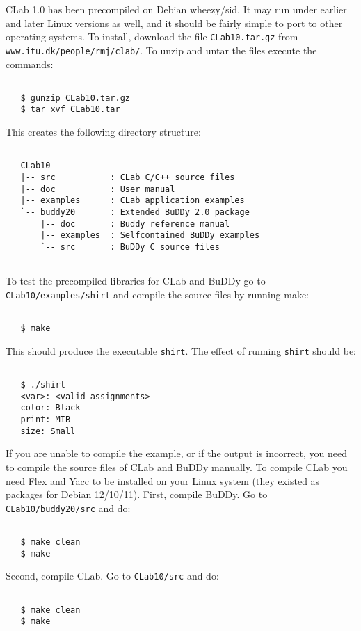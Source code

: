 \documentclass{article}
\begin{document}
CLab 1.0 has been precompiled on Debian wheezy/sid. It may run under
earlier and later Linux versions as well, and it should be fairly simple to 
port to other operating systems. To install, download the file
\texttt{CLab10.tar.gz} from \texttt{www.itu.dk/people/rmj/clab/}. To unzip and
untar the files execute the commands:
\begin{verbatim}

   $ gunzip CLab10.tar.gz
   $ tar xvf CLab10.tar

\end{verbatim}
This creates the following directory structure:
\begin{verbatim}
   
   CLab10
   |-- src           : CLab C/C++ source files
   |-- doc           : User manual
   |-- examples      : CLab application examples
   `-- buddy20       : Extended BuDDy 2.0 package 
       |-- doc       : Buddy reference manual
       |-- examples  : Selfcontained BuDDy examples
       `-- src       : BuDDy C source files
 
\end{verbatim}
To test the precompiled libraries for CLab and BuDDy go to
\texttt{CLab10/examples/shirt} and compile the source files by running
make:
\begin{verbatim}

   $ make

\end{verbatim}
This should produce the executable \texttt{shirt}. The effect of running \texttt{shirt} should be:
\begin{verbatim}

   $ ./shirt
   <var>: <valid assignments>
   color: Black
   print: MIB
   size: Small

\end{verbatim}
If you are unable to compile the example, or if the output is
incorrect, you need to compile the source files of CLab and BuDDy
manually. To compile CLab you need Flex and Yacc to be installed on
your Linux system (they existed as packages for Debian
12/10/11). First, compile BuDDy. Go to \texttt{CLab10/buddy20/src} and
do:
\begin{verbatim}

   $ make clean
   $ make

\end{verbatim}
Second, compile CLab. Go to  \texttt{CLab10/src} and do:
\begin{verbatim}

   $ make clean
   $ make

\end{verbatim}
\end{document}
